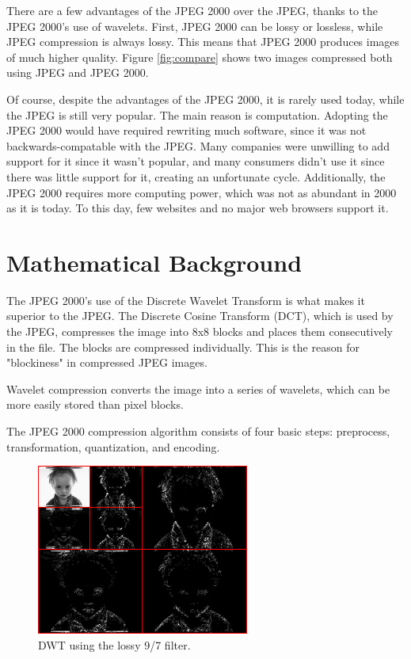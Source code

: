 \documentclass[titlepage,12pt]{article}
\begin{document}
There are a few advantages of the JPEG 2000 over the JPEG,
thanks to the JPEG 2000's use of wavelets.
First, JPEG 2000 can be lossy or lossless, while JPEG compression is always lossy.
This means that JPEG 2000 produces images of much higher quality.
Figure \ref{fig:compare} shows two images compressed both using JPEG and JPEG 2000.

Of course, despite the advantages of the JPEG 2000, it is rarely used today, 
while the JPEG is still very popular.
The main reason is computation.\cite{alternative} 
Adopting the JPEG 2000 would have required rewriting much software, 
since it was not backwards-compatable with the JPEG.
Many companies were unwilling to add support for it since it wasn't popular,
and many consumers didn't use it since there was little support for it,
creating an unfortunate cycle. 
Additionally, the JPEG 2000 requires more computing power, which was not as abundant in 2000 as it is today.
To this day, few websites and no major web browsers support it.


\section{Mathematical Background}

The JPEG 2000's use of the Discrete Wavelet Transform is what makes it superior to the JPEG.\cite{how}
The Discrete Cosine Transform (DCT), which is used by the JPEG, compresses the image into 8x8 blocks
and places them consecutively in the file.
The blocks are compressed individually.
This is the reason for "blockiness" in compressed JPEG images.

Wavelet compression converts the image into a series of wavelets, which can be more easily stored than pixel blocks.

The JPEG 2000 compression algorithm consists of four basic steps: 
preprocess, transformation, quantization, and encoding\cite{whydomath}.

\begin{figure}[h]
	\centering
	\includegraphics[scale=0.6]{resources/lossybaby.png}
	\caption{DWT using the lossy 9/7 filter.}
	\label{fig:lossybaby}
\end{figure}
\end{document}
